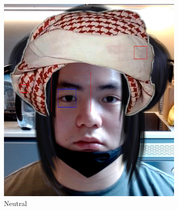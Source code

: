 \documentclass[10pt,twocolumn,letterpaper]{article}
\begin{document}
\begin{figure}[t]
    \centering
    \begin{subfigure}[b]{.49\linewidth}
        \centering
        \includegraphics[width=\linewidth]{Figures/face_shape_1.png}
        \caption{Neutral}
    \end{subfigure}
    \hfill
    \begin{subfigure}[b]{.49\linewidth}
        \centering

\end{subfigure}
\end{figure}
\end{document}
